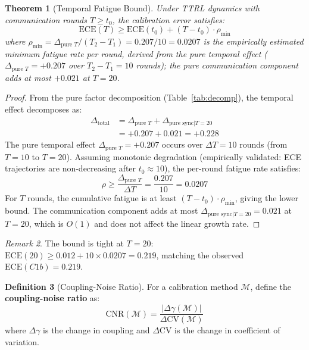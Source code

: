 \documentclass[11pt]{article}
\newcommand{\CV}{\ensuremath{\mathrm{CV}}}
\newcommand{\ECE}{\ensuremath{\mathrm{ECE}}}
\newtheorem{theorem}{Theorem}
\theoremstyle{definition}
\newtheorem{definition}[theorem]{Definition}
\theoremstyle{remark}
\newtheorem{remark}[theorem]{Remark}
\begin{document}
\begin{theorem}[Temporal Fatigue Bound]\label{thm:fatigue}
Under TTRL dynamics with communication rounds $T \geq t_0$, the calibration error satisfies:
\begin{equation}
    \ECE(T) \geq \ECE(t_0) + (T - t_0) \cdot \rho_{\min}
\end{equation}
where $\rho_{\min} = \Delta_{\text{pure } T}/(T_2 - T_1) = 0.207/10 = 0.0207$ is the empirically estimated minimum fatigue rate per round, derived from the pure temporal effect ($\Delta_{\text{pure } T} = +0.207$ over $T_2 - T_1 = 10$ rounds); the pure communication component adds at most $+0.021$ at $T{=}20$.
\end{theorem}

\begin{proof}
From the pure factor decomposition (Table~\ref{tab:decomp}), the temporal effect decomposes as:
\begin{align}
    \Delta_{\text{total}} &= \Delta_{\text{pure } T} + \Delta_{\text{pure sync}|T=20} \\
    &= +0.207 + 0.021 = +0.228
\end{align}
The pure temporal effect $\Delta_{\text{pure } T} = +0.207$ occurs over $\Delta T = 10$ rounds (from $T{=}10$ to $T{=}20$). Assuming monotonic degradation (empirically validated: ECE trajectories are non-decreasing after $t_0 \approx 10$), the per-round fatigue rate satisfies:
\begin{equation}
    \rho \geq \frac{\Delta_{\text{pure } T}}{\Delta T} = \frac{0.207}{10} = 0.0207
\end{equation}
For $T$ rounds, the cumulative fatigue is at least $(T - t_0) \cdot \rho_{\min}$, giving the lower bound. The communication component adds at most $\Delta_{\text{pure sync}|T=20} = 0.021$ at $T{=}20$, which is $O(1)$ and does not affect the linear growth rate.
\end{proof}

\begin{remark}
The bound is tight at $T{=}20$: $\ECE(20) \geq 0.012 + 10 \times 0.0207 = 0.219$, matching the observed $\ECE(C1b) = 0.219$.
\end{remark}

\begin{definition}[Coupling-Noise Ratio]
For a calibration method $\mathcal{M}$, define the \textbf{coupling-noise ratio} as:
\begin{equation}
    \text{CNR}(\mathcal{M}) = \frac{|\Delta\gamma(\mathcal{M})|}{\Delta\CV(\mathcal{M})}
\end{equation}
where $\Delta\gamma$ is the change in coupling and $\Delta\CV$ is the change in coefficient of variation.
\end{definition}
\end{document}
